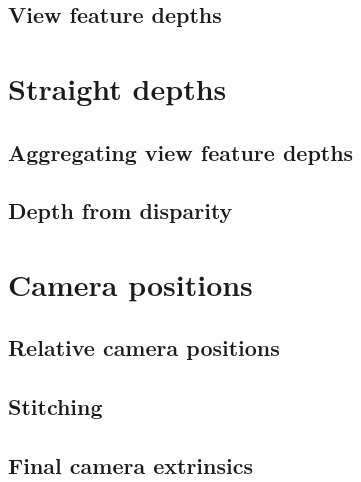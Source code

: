 \documentclass{scrreprt}
\begin{document}
\subsection{View feature depths}

\section{Straight depths}

\subsection{Aggregating view feature depths}

\subsection{Depth from disparity}

\section{Camera positions}

\subsection{Relative camera positions}

\subsection{Stitching}

\subsection{Final camera extrinsics}
 
\end{document}
